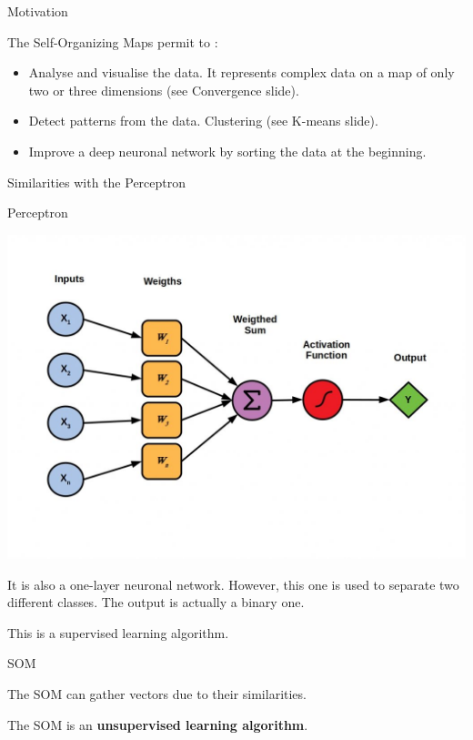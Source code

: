 \documentclass{beamer}
\begin{document}
	
	\begin{frame}{Motivation}

		The Self-Organizing Maps permit to : 

		\begin{itemize}
		
			\item Analyse and visualise the data. It represents complex data on a map of only two or three dimensions (see Convergence slide).

			\item Detect patterns from the data. Clustering (see K-means slide).

			\item Improve a deep neuronal network by sorting the data at the beginning.

		\end{itemize}


	\end{frame}
	
		
	\begin{frame}{Similarities with the Perceptron}
	
		\begin{block}{Perceptron}

			\begin{center}
				
				\includegraphics[width=0.5\linewidth]{pics/Perceptrons-1024x724.jpeg}
			\end{center}

			It is also a one-layer neuronal network. However, this one is used to separate two different classes. The output is actually a binary one. 

			This is a supervised learning algorithm.
		\end{block}

		
		\begin{block}{SOM}
		
			The SOM can gather vectors due to their similarities.

			The SOM is an \textbf{unsupervised learning algorithm}.
		\end{block}



	\end{frame}
	
\end{document}
